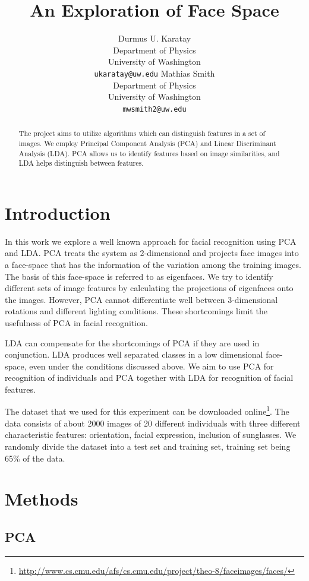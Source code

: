 \documentclass{article} %
\title{An Exploration of Face Space}
\author{
Durmus U. Karatay \\
Department of Physics \\
University of Washington \\
\texttt{ukaratay@uw.edu}
\And
Mathias Smith \\ 
Department of Physics \\
University of Washington \\
\texttt{mwsmith2@uw.edu}
}
\begin{document}
\maketitle

\begin{abstract}
The project aims to utilize algorithms which can distinguish features in a set of images.  We employ Principal Component Analysis (PCA) and Linear Discriminant Analysis (LDA).  PCA allows us to identify features based on image similarities, and LDA helps distinguish between features.  
\end{abstract}

\section{Introduction}

In this work we explore a well known approach for facial recognition using PCA and LDA.  PCA treats the system as 2-dimensional and projects face images into a face-space that has the information of the variation among the training images. The basis of this face-space is referred to as eigenfaces.  We try to identify different sets of image features by calculating the projections of eigenfaces onto the images.  However, PCA cannot differentiate well between 3-dimensional rotations and different lighting conditions.  These shortcomings limit the usefulness of PCA in facial recognition.

LDA can compensate for the shortcomings of PCA if they are used in conjunction.  LDA produces well separated classes in a low dimensional face-space, even under the conditions discussed above.  We aim to use PCA for recognition of individuals and PCA together with LDA for recognition of facial features.

The dataset that we used for this experiment can be downloaded online\footnote{\url{http://www.cs.cmu.edu/afs/cs.cmu.edu/project/theo-8/faceimages/faces/}}.  The data consists of about 2000 images of 20 different individuals with three different characteristic features: orientation, facial expression, inclusion of sunglasses.  We randomly divide the dataset into a test set and training set, training set being 65\% of the data.

\section{Methods}

\subsection{PCA}
\end{document}

